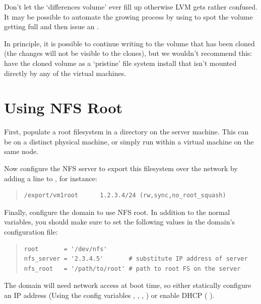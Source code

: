 \documentclass[11pt,twoside,final,openright]{report}
\begin{document}
Don't let the `differences volume' ever fill up otherwise LVM gets
rather confused. It may be possible to automate the growing
process by using  to spot the volume getting full
and then issue an .

In principle, it is possible to continue writing to the volume
that has been cloned (the changes will not be visible to the
clones), but we wouldn't recommend this: have the cloned volume
as a `pristine' file system install that isn't mounted directly
by any of the virtual machines.


\section{Using NFS Root}

First, populate a root filesystem in a directory on the server
machine. This can be on a distinct physical machine, or simply 
run within a virtual machine on the same node.

Now configure the NFS server to export this filesystem over the
network by adding a line to , for instance:

\begin{quote}
\begin{small}
\begin{verbatim}
/export/vm1root      1.2.3.4/24 (rw,sync,no_root_squash)
\end{verbatim}
\end{small}
\end{quote}

Finally, configure the domain to use NFS root.  In addition to the
normal variables, you should make sure to set the following values in
the domain's configuration file:

\begin{quote}
\begin{small}
\begin{verbatim}
root       = '/dev/nfs'
nfs_server = '2.3.4.5'       # substitute IP address of server 
nfs_root   = '/path/to/root' # path to root FS on the server
\end{verbatim}
\end{small}
\end{quote}

The domain will need network access at boot time, so either statically
configure an IP address (Using the config variables , 
, , ) or enable DHCP (
).
\end{document}
